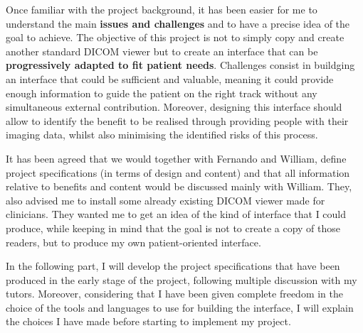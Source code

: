 Once familiar with the project background, it has been easier for me to understand the main \textbf{issues and challenges} and to have a precise idea of the goal to achieve. The objective of this project is not to simply copy and create another standard DICOM viewer but to create an interface that can be \textbf{progressively adapted to fit patient needs}. Challenges consist in buildging an interface that could be sufficient and valuable, meaning it could provide enough information to guide the patient on the right track without any simultaneous external contribution. Moreover, designing this interface should allow to identify the benefit to be realised through providing people with their imaging data, whilst also minimising the identified risks of this process.

\newline \vspace{5mm}
It has been agreed that we would together with Fernando and William, define project specifications (in terms of design and content) and that all information relative to benefits and content would be discussed mainly with William. They, also advised me to install some already existing DICOM viewer made for clinicians. They wanted me to get an idea of the kind of interface that I could produce, while keeping in mind that the goal is not to create a copy of those readers, but to produce my own patient-oriented interface.

\newline \vspace{5mm}
In the following part, I will develop the project specifications that have been produced in the early stage of the project, following multiple discussion with my tutors. Moreover, considering that I have been given complete freedom in the choice of the tools and languages to use for building the interface, I will explain the choices I have made before starting to implement my project.



